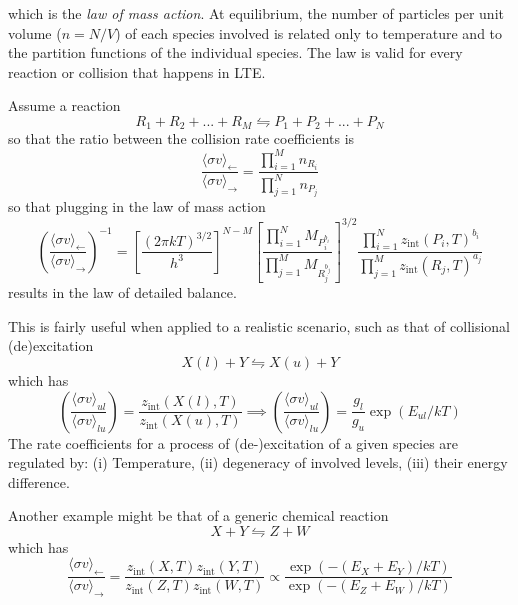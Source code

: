 which is the \emph{law of mass action}. At equilibrium, the number of particles per unit volume ($n=N/V$) of each species involved
is related only to temperature and to the partition functions of the individual species. The law is valid for every reaction or collision that happens in LTE.
\par Assume a reaction 
\begin{equation*}
    R_{1}+R_{2}+...+R_{M} \leftrightharpoons P_{1}+P_{2}+...+P_{N}
\end{equation*}
so that the ratio between the collision rate coefficients is 
\begin{equation*}
    \frac{\langle \sigma v \rangle_{\leftarrow}}{\langle \sigma v \rangle_{\rightarrow}} = \frac{\prod_{i=1}^{M}n_{R_{i}}}{\prod_{j=1}^{N}n_{P_{j}}}
\end{equation*}
so that plugging in the law of mass action 
\begin{equation}
    \boxed{
    \left(\frac{\langle \sigma v \rangle_{\leftarrow}}{\langle \sigma v \rangle_{\rightarrow}}\right)^{-1} = \left[\frac{(2\pi kT)^{3/2}}{h^{3}}\right]^{N - M}\left[\frac{\prod_{i = 1}^{N}M_{P_{i}^{b_{i}}}}{\prod_{j = 1}^{M}M_{R_{j}^{b_{j}}}}\right]^{3/2}\frac{\prod_{i=1}^{N}z_{\text{int}}(P_{i}, T)^{b_{i}}}{\prod_{j=1}^{M}z_{\text{int}}(R_{j}, T)^{a_{j}}}
    }
    \label{eq:detailedbalance}
\end{equation}
results in the law of detailed balance.
\par This is fairly useful when applied to a realistic scenario, such as that of collisional (de)excitation
\begin{equation*}
    X(l) + Y \leftrightharpoons X(u) + Y
\end{equation*}
which has 
\begin{equation}
    \left(\frac{\langle \sigma v \rangle_{ul}}{\langle \sigma v \rangle_{lu}}\right) = \frac{z_{\text{int}}(X(l), T)}{z_{\text{int}}(X(u), T)} \implies \left(\frac{\langle \sigma v \rangle_{ul}}{\langle \sigma v \rangle_{lu}}\right) = \frac{g_{l}}{g_{u}}\exp\left(E_{ul}/kT\right)
\end{equation}
The rate coefficients for a process of (de-)excitation of a given species are regulated by: (i) Temperature, (ii) degeneracy of involved levels, (iii) their energy difference.
\par Another example might be that of a generic chemical reaction
\begin{equation*}
    X + Y \leftrightharpoons Z + W
\end{equation*}
which has 
\begin{equation}
    \frac{\langle \sigma v \rangle_{\leftarrow}}{\langle \sigma v \rangle_{\rightarrow}} = \frac{z_{\text{int}}(X, T)z_{\text{int}}(Y, T)}{z_{\text{int}}(Z, T)z_{\text{int}}(W, T)} \propto \frac{\exp\left(-(E_{X}+E_{Y})/kT\right)}{\exp\left(-(E_{Z}+E_{W})/kT\right)}
\end{equation}

